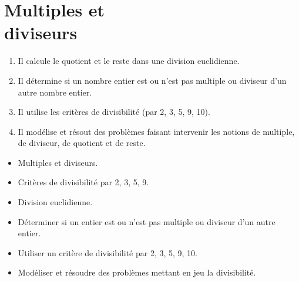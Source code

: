 \setlength{\doublerulesep}{0.3pt}

\themaN
\graphicspath{{../../S11_Multiples_et_diviseurs/Images/}}

\chapter{Multiples et\\diviseurs}
\label{S11}


\begin{autoeval}
   \small
   \begin{enumerate}
      \item Il calcule le quotient et le reste dans une division euclidienne.
      \item Il détermine si un nombre entier est ou n’est pas multiple ou diviseur d’un autre nombre entier.
      \item Il utilise les critères de divisibilité (par 2, 3, 5, 9, 10).
      \item Il modélise et résout des problèmes faisant intervenir les notions de multiple, de diviseur, de quotient et de reste.
   \end{enumerate}
\end{autoeval}

\begin{prerequis}
   \begin{itemize}
      \item Multiples et diviseurs.
      \item Critères de divisibilité par 2, 3, 5, 9.
      \item Division euclidienne.
      \item[\com] Déterminer si un entier est ou n'est pas multiple ou diviseur d'un autre entier.
      \item[\com] Utiliser un critère de divisibilité par 2, 3, 5, 9, 10.
      \item[\com] Modéliser et résoudre des problèmes mettant en jeu la divisibilité.
   \end{itemize}
\end{prerequis}

\vfill


